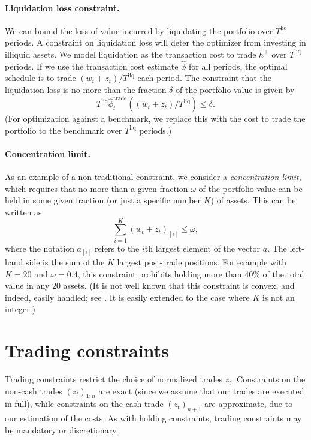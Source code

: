 \documentclass[openany]{article}  %
\newcommand{\trcosthat}{\hat \phi^\mathrm{trade}}
\renewcommand{\S}{section~}
\begin{document}
\paragraph{Liquidation loss constraint.}
We can bound the loss of value incurred by liquidating
the portfolio over $T^\mathrm{liq}$ periods.
A constraint on liquidation loss will deter the optimizer from investing in
illiquid assets.
We model liquidation as the transaction cost to trade $h^+$ over
$T^\mathrm{liq}$ periods.
If we use the transaction cost estimate $\hat \phi$ for all periods,
the optimal schedule is to trade $(w_t + z_t)/T^\mathrm{liq}$ each period.
The constraint that the liquidation loss is no more than the fraction $\delta$
of the portfolio value is given by
\[
T^\mathrm{liq} \trcosthat_t((w_t + z_t)/T^\mathrm{liq}) \leq \delta.
\]
(For optimization against a benchmark, we replace this with the
cost to trade the portfolio to the benchmark
over $T^\mathrm{liq}$ periods.)

\paragraph{Concentration limit.}
As an example of a non-traditional constraint, we consider a
\emph{concentration limit}, which requires that no more than a given fraction $\omega$
of the portfolio value can be held in some given fraction
(or just a specific number $K$) of assets.  This can be written as
\[
\sum_{i=1}^K (w_t+z_t)_{[i]} \leq \omega,
\]
where the notation $a_{[i]}$ refers to the $i$th largest
element of the vector $a$.  The left-hand side is the sum of the $K$ largest
post-trade positions.
For example with $K=20$ and $\omega = 0.4$, this constraint prohibits holding
more than $40\%$ of the total value in any $20$ assets.
(It is not well known that this constraint is convex, and indeed,
easily handled; see \cite[\S 3.2.3]{boyd2004convex}.
It is easily extended to the case where $K$ is not an integer.)

\section{Trading constraints}
\label{s-trading-constr}

Trading constraints restrict the choice of normalized trades $z_t$.
Constraints on the non-cash trades $(z_t)_{1:n}$
are exact (since we assume that our trades are executed in full),
while constraints on the cash trade $(z_t)_{n+1}$ are approximate,
due to our estimation of the costs.
As with holding constraints, trading constraints may be mandatory
or discretionary.
\end{document}
